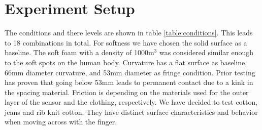 \section{Experiment Setup}
The conditions and there levels are shown in table \ref{table:conditions}. This leads to 18 combinations in total. For softness we have chosen the solid surface as a baseline. The soft foam with a density of 1000m$^3$ was considered similar enough to the soft spots on the human body. Curvature has a flat surface as baseline, 66mm diameter curvature, and 53mm diameter as fringe condition. Prior testing has proven that going below 53mm leads to permanent contact due to a kink in the spacing material. Friction is depending on the materials used for the outer layer of the sensor and the clothing, respectively. We have decided to test cotton, jeans and rib knit cotton. They have distinct surface characteristics and behavior when moving across with the finger. \\ \\
